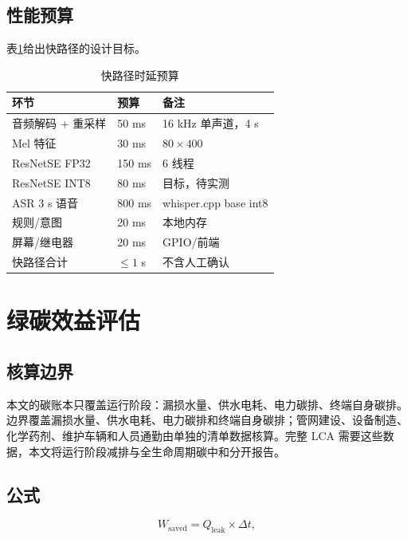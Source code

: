 \documentclass[UTF8,11pt,a4paper,fontset=none]{ctexart}
\begin{document}
\subsection{性能预算}

表\ref{tab:budget}给出快路径的设计目标。

\begin{table}[H]
\centering
\small
\caption{快路径时延预算}
\label{tab:budget}
\begin{tabular}{p{5.2cm}p{3.8cm}p{5.4cm}}
\toprule
环节 & 预算 & 备注 \\
\midrule
音频解码 + 重采样 & 50 ms & 16 kHz 单声道，4 s \\
Mel 特征 & 30 ms & \(80\times400\) \\
ResNetSE FP32 & 150 ms & 6 线程 \\
ResNetSE INT8 & 80 ms & 目标，待实测 \\
ASR 3 s 语音 & 800 ms & whisper.cpp base int8 \\
规则/意图 & 20 ms & 本地内存 \\
屏幕/继电器 & 20 ms & GPIO/前端 \\
\midrule
快路径合计 & \(\leq 1\) s & 不含人工确认 \\
\bottomrule
\end{tabular}
\end{table}

\section{绿碳效益评估}
\label{sec:carbon}

\subsection{核算边界}

本文的碳账本只覆盖运行阶段：漏损水量、供水电耗、电力碳排、终端自身碳排。边界覆盖漏损水量、供水电耗、电力碳排和终端自身碳排；管网建设、设备制造、化学药剂、维护车辆和人员通勤由单独的清单数据核算。完整 LCA 需要这些数据，本文将运行阶段减排与全生命周期碳中和分开报告。

\subsection{公式}

\begin{equation}
  W_{\text{saved}} = Q_{\text{leak}} \times \Delta t,
  \label{eq:water}
\end{equation}
\end{document}

